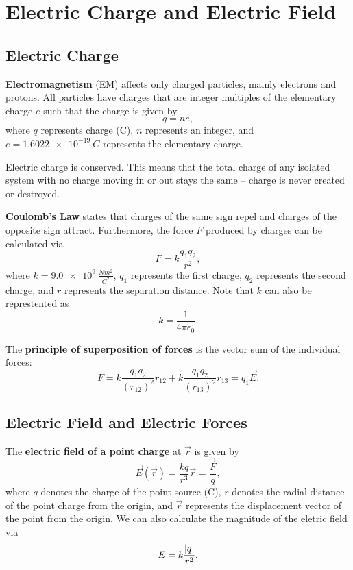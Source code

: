 
\chapter{Electric Charge and Electric Field}

\section{Electric Charge}
\textbf{Electromagnetism} (EM) affects only charged particles, mainly electrons and protons. All particles have charges that are integer multiples of the elementary charge $e$ such that the charge is given by
\begin{equation}
q = ne,
\end{equation}
where $q$ represents charge (C), $n$ represents an integer, and $e = \SI{1.6022e-19}{C}$ represents the elementary charge.

Electric charge is conserved. This means that the total charge of any isolated system with no charge moving in or out stays the same -- charge is never created or destroyed. 

\textbf{Coulomb's Law} states that charges of the same sign repel and charges of the opposite sign attract. Furthermore, the force $F$ produced by charges can be calculated via
\begin{equation}
F = k\frac{q_1q_2}{r^2},
\end{equation}
where $k = \SI{9.0e9}{\frac{N m^2}{C^2}}$, $q_1$ represents the first charge, $q_2$ represents the second charge, and $r$ represents the separation distance. Note that $k$ can also be represtented as 
\begin{equation}
    k = \dfrac{1}{4\pi\epsilon_0}.
\end{equation}

The \textbf{principle of superposition of forces} is the vector sum of the individual forces:
\begin{equation}
F = k\frac{q_1q_2}{(r_{12})^2}r_{12} + k\frac{q_1q_2}{(r_{13})^2}r_{13} = q_1 \vec{E}.
\end{equation}

\section{Electric Field and Electric Forces}
The \textbf{electric field of a point charge} at $\vec{r}$ is given by
\begin{equation}
\vec E (\vec r)= \frac{kq}{r^3}\vec{r} = \frac{\vec{F}}{q},
\end{equation}
where $q$ denotes the charge of the point source (C), $r$ denotes the radial distance of the point charge from the origin, and $\vec{r}$ represents the displacement vector of the point from the origin. We can also calculate the magnitude of the eletric field via
\begin{equation}
E = k\dfrac{\left| q \right|}{r^2}.
\end{equation}


